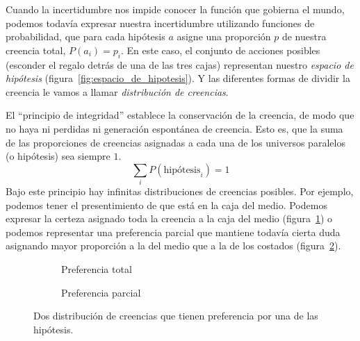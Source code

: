 \documentclass[a4paper,11pt]{book}
\theoremstyle{definition}
\begin{document}

Cuando la incertidumbre nos impide conocer la funci\'on que gobierna el mundo, podemos todav\'ia expresar nuestra incertidumbre utilizando funciones de probabilidad, que para cada hip\'otesis $a$ asigne una proporci\'on $p$ de nuestra creencia total, $P(a_i) = p_i$.
%
En este caso, el conjunto de acciones posibles (esconder el regalo detr\'as de una de las tres cajas) representan nuestro \emph{espacio de hip\'otesis} (figura~\ref{fig:espacio_de_hipotesis}).
%
Y las diferentes formas de dividir la creencia le vamos a llamar \emph{distribuci\'on de creencias}.


El ``principio de integridad'' establece la conservaci\'on de la creencia, de modo que no haya ni perdidas ni generaci\'on espont\'anea de creencia.
%
Esto es, que la suma de las proporciones de creencias asignadas a cada una de los universos paralelos (o hip\'otesis) sea siempre $1$.
%
\begin{equation}
\sum_{i} P(\text{hip\'otesis}_i) = 1
\end{equation}
%
Bajo este principio hay infinitas distribuciones de creencias posibles.
%
Por ejemplo, podemos tener el presentimiento de que est\'a en la caja del medio.
%
Podemos expresar la certeza asignado toda la creencia a la caja del medio (figura~\ref{fig:preferencia_total}) o podemos representar una preferencia parcial que mantiene todav\'ia cierta duda asignando mayor proporción a la del medio que a la de los costados (figura~\ref{fig:preferencia_parcial}).


\begin{figure}[ht!]
 \centering
 \begin{subfigure}[b]{0.48\textwidth}
 \centering
    \caption{Preferencia total}
    \label{fig:preferencia_total}
 \end{subfigure}
 \begin{subfigure}[b]{0.48\textwidth}
 \centering
    \caption{Preferencia parcial}
    \label{fig:preferencia_parcial}
 \end{subfigure}
\caption{Dos distribuci\'on de creencias que tienen preferencia por una de las hip\'otesis.}
 \label{fig:distribucion_de_creencias}
\end{figure}
\end{document}
